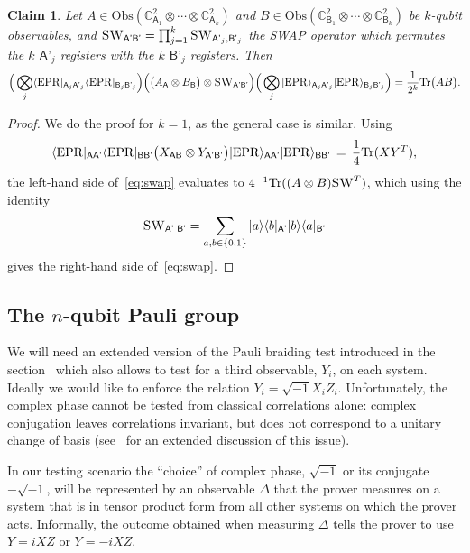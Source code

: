 \documentclass[11pt]{article}
\newtheorem{claim}[theorem]{Claim}
\theoremstyle{remark}
\theoremstyle{definition}
\newcommand{\ket}[1]{|#1\rangle}
\newcommand{\bra}[1]{\langle#1|}
\newcommand{\Tr}{\mbox{\rm Tr}}
\newcommand{\reg}[1]{{\textsf{#1}}}
\newcommand{\C}{\ensuremath{\mathbb{C}}}
\newcommand{\setft}[1]{\mathrm{#1}}
\newcommand{\Obs}{\setft{Obs}}
\newcommand{\EPR}{{\rm EPR}}
\newcommand{\SWAP}{\textsc{SW}}
\begin{document}
\begin{claim}\label{claim:swap-tt}
Let $A\in \Obs(\C^2_{\reg{A}_1}\otimes \cdots\otimes \C^2_{\reg{A}_k})$ and $B\in \Obs(\C^2_{\reg{B}_1}\otimes \cdots\otimes \C^2_{\reg{B}_k})$ be $k$-qubit observables, and $\SWAP_{\reg{A'B'}} = \prod_{j=1}^k \SWAP_{\reg{A'}_j,\reg{B'}_j}$ the SWAP operator which permutes the $k$ $\reg{A'}_j$ registers with the $k$ $\reg{B'}_j$ registers.  Then 
\begin{equation}\label{eq:swap}
 \Big(\bigotimes_j \bra{\EPR}_{\reg{A}_j\reg{A'}_j}\bra{\EPR}_{\reg{B}_j\reg{B'}_j} \Big)\Big(\big(A_{\reg{A}}\otimes B _{\reg{B}}\big)\otimes \SWAP_{\reg{A'B'}}\Big) \Big(\bigotimes_j \ket{\EPR}_{\reg{A}_j\reg{A'}_j}\ket{\EPR}_{\reg{B}_j\reg{B'}_j} \Big) = \frac{1}{2^{k}}\Tr\big(A B\big).
\end{equation}
\end{claim}


\begin{proof}
We do the proof for $k=1$, as the general case is similar. Using 
$$\bra{\EPR}_{\reg{AA'}}\bra{\EPR}_{\reg{BB'}} \big( X_{\reg{AB}} \otimes Y_{\reg{A'B'}} \big) \ket{\EPR}_{\reg{AA'}}\ket{\EPR}_{\reg{BB'}} \,=\, \frac{1}{4}\Tr(XY^T),$$
the left-hand side of~\eqref{eq:swap} evaluates to $4^{-1} \Tr( (A\otimes B) \SWAP^T)$, which using the identity 
$$\SWAP_{\reg{A' B'}} = \sum_{a,b\in\{0,1\}} \ket{a}\bra{b}_\reg{A'}\ket{b}\bra{a}_{\reg{B'}}$$
gives the right-hand side of~\eqref{eq:swap}.
\end{proof}


\subsection{The $n$-qubit Pauli group}
\label{sec:e-pbt}

We will need an extended version of the Pauli braiding test introduced in the section~\label{sec:pbt} which also allows to test for a third observable, $Y_i$, on each system. Ideally we would like to enforce the relation $Y_i=\sqrt{-1}X_iZ_i$. Unfortunately, the complex phase cannot be tested from classical correlations alone: complex conjugation leaves correlations invariant, but does not correspond to a unitary change of basis  (see~\cite[Appendix A]{reichardt2012classicalarxiv} for an extended discussion of this issue). 

In our testing scenario the ``choice'' of complex phase, $\sqrt{-1}$ or its conjugate $-\sqrt{-1}$, will be represented by an observable $\Delta$ that the prover measures on a system that is in tensor product form from all other systems on which the prover acts. Informally, the outcome obtained when measuring $\Delta$ tells the prover to use $Y = i XZ$ or $Y=-iXZ$. 
\end{document}
